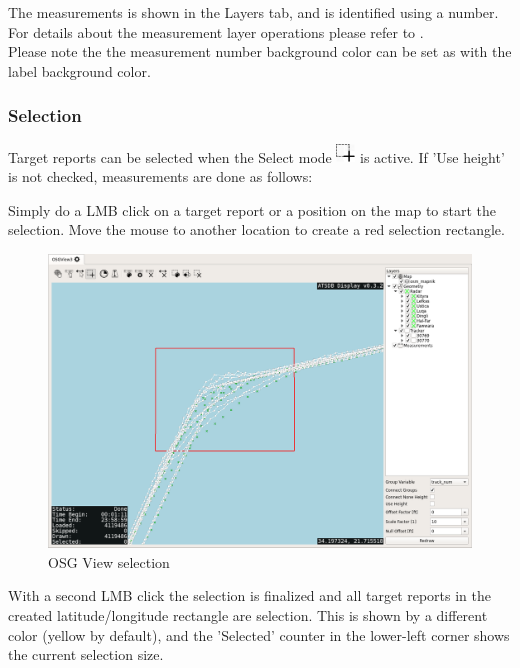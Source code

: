 The measurements is shown in the Layers tab, and is identified using a number. For details about the measurement layer operations please refer to . \\

Please note the the measurement number background color can be set as with the label background color. 

\subsubsection{Selection}

Target reports can be selected when the Select mode \includegraphics[width=0.5cm,frame]{../../data/icons/select_action.png} is active. If 'Use height' is not checked, measurements are done as follows:

Simply do a LMB click on a target report or a position on the map to start the selection. Move the mouse to another location to create a red selection rectangle.

\begin{figure}[H]
    \hspace*{-2cm}
    \includegraphics[width=18cm,frame]{../screenshots/osgview_select1.png}
  \caption{OSG View selection}
\end{figure}

With a second LMB click the selection is finalized and all target reports in the created latitude/longitude rectangle are selection. This is shown by a different color (yellow by default), and the 'Selected' counter in the lower-left corner shows the current selection size.

